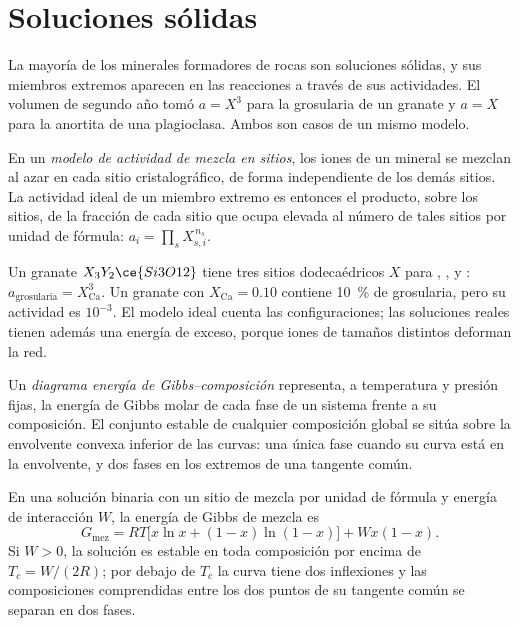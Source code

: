 \section{Soluciones sólidas}\label{sec:b3:petrological-thermodynamics:solutions}

La mayoría de los minerales formadores de rocas son soluciones sólidas, y sus miembros extremos aparecen
en las reacciones a través de sus actividades. El volumen de segundo año tomó $a = X^3$ para
la grosularia de un granate y $a = X$ para la anortita de una plagioclasa.
Ambos son casos de un mismo modelo.

\begin{definition}\label{def:b3:petrological-thermodynamics:site-mixing}
En un \emph{modelo de actividad de mezcla en sitios}, los
iones de un mineral se mezclan al azar en cada sitio cristalográfico, de forma independiente
de los demás sitios. La actividad ideal de un miembro extremo es entonces el producto,
sobre los sitios, de la fracción de cada sitio que ocupa elevada al número de
tales sitios por unidad de fórmula: $a_i = \prod_s X_{s,i}^{\,n_s}$.
\end{definition}

Un granate $X_3Y_2\ce{Si3O12}$ tiene tres sitios dodecaédricos $X$ para
, ,  y : $a_{\text{grosularia}} =
X_{\text{Ca}}^3$. Un granate con $X_{\text{Ca}} = 0.10$ contiene
\qty{10}{\percent} de grosularia, pero su actividad es $10^{-3}$. El
modelo ideal cuenta las configuraciones; las soluciones reales tienen además una energía de exceso,
porque iones de tamaños distintos deforman la red.

\begin{definition}\label{def:b3:petrological-thermodynamics:gx}
Un \emph{diagrama energía de Gibbs--composición}
representa, a temperatura y presión fijas, la energía de Gibbs molar de
cada fase de un sistema frente a su composición. El conjunto estable de cualquier
composición global se sitúa sobre la envolvente convexa inferior de las curvas: una única fase
cuando su curva está en la envolvente, y dos fases en los extremos de una tangente común.
\end{definition}

\begin{proposition}\label{prop:b3:petrological-thermodynamics:regular}
En una solución binaria con un sitio de mezcla por unidad de fórmula y
energía de interacción $W$, la energía de Gibbs de mezcla es
\[
  G_{\text{mez}} = RT\bigl[x\ln x + (1 - x)\ln(1 - x)\bigr] + Wx(1 - x).
\]
Si $W > 0$, la solución es estable en toda composición por encima de $T_c =
W/(2R)$; por debajo de $T_c$ la curva tiene dos inflexiones y las composiciones
comprendidas entre los dos puntos de su tangente común se separan en dos fases.
\end{proposition}

